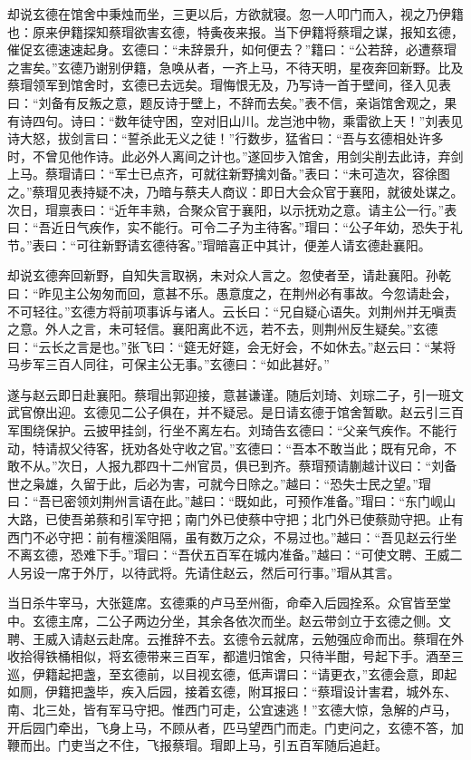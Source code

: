 却说玄德在馆舍中秉烛而坐，三更以后，方欲就寝。忽一人叩门而入，视之乃伊籍也：原来伊籍探知蔡瑁欲害玄德，特夤夜来报。当下伊籍将蔡瑁之谋，报知玄德，催促玄德速速起身。玄德曰：“未辞景升，如何便去？”籍曰：“公若辞，必遭蔡瑁之害矣。”玄德乃谢别伊籍，急唤从者，一齐上马，不待天明，星夜奔回新野。比及蔡瑁领军到馆舍时，玄德已去远矣。瑁悔恨无及，乃写诗一首于壁间，径入见表曰：“刘备有反叛之意，题反诗于壁上，不辞而去矣。”表不信，亲诣馆舍观之，果有诗四句。诗曰：“数年徒守困，空对旧山川。龙岂池中物，乘雷欲上天！”刘表见诗大怒，拔剑言曰：“誓杀此无义之徒！”行数步，猛省曰：“吾与玄德相处许多时，不曾见他作诗。此必外人离间之计也。”遂回步入馆舍，用剑尖削去此诗，弃剑上马。蔡瑁请曰：“军士已点齐，可就往新野擒刘备。”表曰：“未可造次，容徐图之。”蔡瑁见表持疑不决，乃暗与蔡夫人商议：即日大会众官于襄阳，就彼处谋之。次日，瑁禀表曰：“近年丰熟，合聚众官于襄阳，以示抚劝之意。请主公一行。”表曰：“吾近日气疾作，实不能行。可令二子为主待客。”瑁曰：“公子年幼，恐失于礼节。”表曰：“可往新野请玄德待客。”瑁暗喜正中其计，便差人请玄德赴襄阳。

却说玄德奔回新野，自知失言取祸，未对众人言之。忽使者至，请赴襄阳。孙乾曰：“昨见主公匆匆而回，意甚不乐。愚意度之，在荆州必有事故。今忽请赴会，不可轻往。”玄德方将前项事诉与诸人。云长曰：“兄自疑心语失。刘荆州并无嗔责之意。外人之言，未可轻信。襄阳离此不远，若不去，则荆州反生疑矣。”玄德曰：“云长之言是也。”张飞曰：“筵无好筵，会无好会，不如休去。”赵云曰：“某将马步军三百人同往，可保主公无事。”玄德曰：“如此甚好。”

遂与赵云即日赴襄阳。蔡瑁出郭迎接，意甚谦谨。随后刘琦、刘琮二子，引一班文武官僚出迎。玄德见二公子俱在，并不疑忌。是日请玄德于馆舍暂歇。赵云引三百军围绕保护。云披甲挂剑，行坐不离左右。刘琦告玄德曰：“父亲气疾作。不能行动，特请叔父待客，抚劝各处守收之官。”玄德曰：“吾本不敢当此；既有兄命，不敢不从。”次日，人报九郡四十二州官员，俱已到齐。蔡瑁预请蒯越计议曰：“刘备世之枭雄，久留于此，后必为害，可就今日除之。”越曰：“恐失士民之望。”瑁曰：“吾已密领刘荆州言语在此。”越曰：“既如此，可预作准备。”瑁曰：“东门岘山大路，已使吾弟蔡和引军守把；南门外已使蔡中守把；北门外已使蔡勋守把。止有西门不必守把：前有檀溪阻隔，虽有数万之众，不易过也。”越曰：“吾见赵云行坐不离玄德，恐难下手。”瑁曰：“吾伏五百军在城内准备。”越曰：“可使文聘、王威二人另设一席于外厅，以待武将。先请住赵云，然后可行事。”瑁从其言。

当日杀牛宰马，大张筵席。玄德乘的卢马至州衙，命牵入后园拴系。众官皆至堂中。玄德主席，二公子两边分坐，其余各依次而坐。赵云带剑立于玄德之侧。文聘、王威入请赵云赴席。云推辞不去。玄德令云就席，云勉强应命而出。蔡瑁在外收拾得铁桶相似，将玄德带来三百军，都遣归馆舍，只待半酣，号起下手。酒至三巡，伊籍起把盏，至玄德前，以目视玄德，低声谓曰：“请更衣，”玄德会意，即起如厕，伊籍把盏毕，疾入后园，接着玄德，附耳报曰：“蔡瑁设计害君，城外东、南、北三处，皆有军马守把。惟西门可走，公宜速逃！”玄德大惊，急解的卢马，开后园门牵出，飞身上马，不顾从者，匹马望西门而走。门吏问之，玄德不答，加鞭而出。门吏当之不住，飞报蔡瑁。瑁即上马，引五百军随后追赶。

